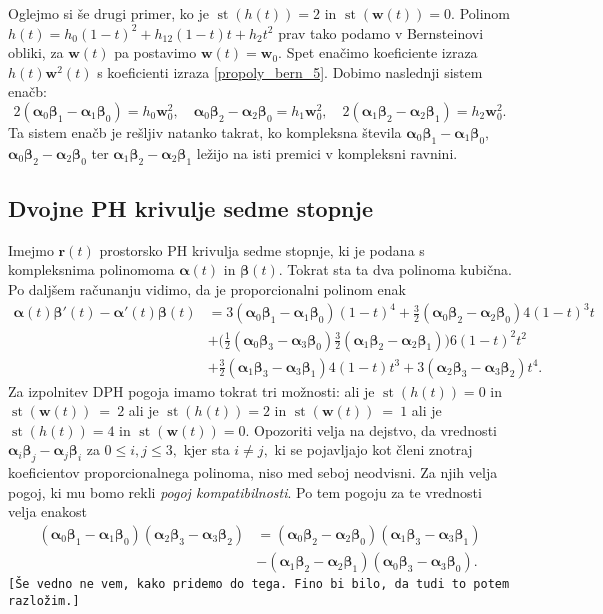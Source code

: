 \documentclass[12pt,a4paper,twoside]{article}
\theoremstyle{definition} %
\theoremstyle{plain} %
\numberwithin{equation}{section}  %
\newcommand{\rV}{\mathbf{r}}
\newcommand{\wV}{\mathbf{w}}
\newcommand{\balpha}{\boldsymbol \alpha}
\newcommand{\bbeta}{\boldsymbol \beta}
\DeclareMathOperator{\st}{st}
\begin{document}
Oglejmo si še drugi primer, ko je $\st(h(t))=2$ in $\st(\wV(t))=0.$ Polinom $h(t)=h_0(1-t)^2+h_12(1-t)t+h_2t^2$ prav tako podamo v Bernsteinovi obliki, za $\wV(t)$ pa postavimo $\wV(t)=\wV_0.$ Spet enačimo koeficiente izraza $h(t)\wV^2(t)$ s koeficienti izraza \eqref{propoly_bern_5}. Dobimo naslednji sistem enačb:
\begin{equation}
	2(\balpha_0\bbeta_1-\balpha_1\bbeta_0)=h_0\wV_0^2,\quad \balpha_0\bbeta_2-\balpha_2\bbeta_0=h_1\wV_0^2,\quad 2(\balpha_1\bbeta_2-\balpha_2\bbeta_1)=h_2\wV_0^2.\label{st5h2w0}
\end{equation}
Ta sistem enačb je rešljiv natanko takrat, ko kompleksna števila $\balpha_0\bbeta_1-\balpha_1\bbeta_0,$ $\balpha_0\bbeta_2-\balpha_2\bbeta_0$ ter $\balpha_1\bbeta_2-\balpha_2\bbeta_1$ ležijo na isti premici v kompleksni ravnini.

\subsection{Dvojne PH krivulje sedme stopnje}
\label{poglavje_dvojnePHkrivulje7}

Imejmo $\rV(t)$ prostorsko PH krivulja sedme stopnje, ki je podana s kompleksnima polinomoma $\balpha(t)$ in $\bbeta(t).$ Tokrat sta ta dva polinoma kubična. Po daljšem računanju vidimo, da je proporcionalni polinom enak
\begin{align}
	\balpha(t)\bbeta'(t)-\balpha'(t)\bbeta(t)&=3(\balpha_0\bbeta_1-\balpha_1\bbeta_0)(1-t)^4+\frac{3}{2}(\balpha_0\bbeta_2-\balpha_2\bbeta_0)4(1-t)^3t\nonumber\\
	&+\big(\frac{1}{2}(\balpha_0\bbeta_3-\balpha_3\bbeta_0)\frac{3}{2}(\balpha_1\bbeta_2-\balpha_2\bbeta_1)\big)6(1-t)^2t^2\nonumber\\
	&+\frac{3}{2}(\balpha_1\bbeta_3-\balpha_3\bbeta_1)4(1-t)t^3+3(\balpha_2\bbeta_3-\balpha_3\bbeta_2)t^4. \label{propoly_bern_7}
\end{align}
Za izpolnitev DPH pogoja imamo tokrat tri možnosti: ali je $\st(h(t))=0$ in \\$\st(\wV(t))~=~2$ ali je $\st(h(t))=2$ in $\st(\wV(t))~=~1$ ali je $\st(h(t))=4$ in $\st(\wV(t))=0.$ Opozoriti velja na dejstvo, da vrednosti $\balpha_i\bbeta_j-\balpha_j\bbeta_i$ za $0\leq i,j\leq 3,$ kjer sta $i\neq j,$ ki se pojavljajo kot členi znotraj koeficientov proporcionalnega polinoma, niso med seboj neodvisni. Za njih velja pogoj, ki mu bomo rekli \emph{pogoj kompatibilnosti}. Po tem pogoju za te vrednosti velja enakost
\begin{align}
	(\balpha_0\bbeta_1-\balpha_1\bbeta_0)(\balpha_2\bbeta_3-\balpha_3\bbeta_2)&=(\balpha_0\bbeta_2-\balpha_2\bbeta_0)(\balpha_1\bbeta_3-\balpha_3\bbeta_1)\nonumber\\
	&-(\balpha_1\bbeta_2-\balpha_2\bbeta_1)(\balpha_0\bbeta_3-\balpha_3\bbeta_0).\label{pogoj_kompatibilnosti}
\end{align}
\texttt{[Še vedno ne vem, kako pridemo do tega. Fino bi bilo, da tudi to potem razložim.]}
\end{document}
